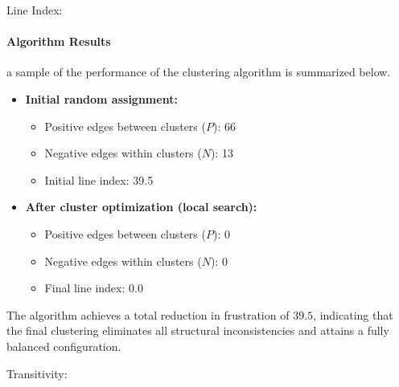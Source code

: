 \begin{question}
\begin{subquestion}{Line Index:}
\begin{enumerate}
{				\paragraph{Algorithm Results}
				a sample of the performance of the clustering algorithm is summarized below.
				
				\begin{itemize}
					\item \textbf{Initial random assignment:}
					\begin{itemize}
						\item Positive edges between clusters ($P$): 66
						\item Negative edges within clusters ($N$): 13
						\item Initial line index: 39.5
					\end{itemize}
					
					\item \textbf{After cluster optimization (local search):}
					\begin{itemize}
						\item Positive edges between clusters ($P$): 0
						\item Negative edges within clusters ($N$): 0
						\item Final line index: 0.0
					\end{itemize}
				\end{itemize}
				
				The algorithm achieves a total reduction in frustration of $39.5$, indicating that the final clustering eliminates all structural inconsistencies and attains a fully balanced configuration.				
			}
		\end{enumerate}		
	\end{subquestion}
	\begin{subquestion}{Transitivity:}
\end{subquestion}
\end{question}
